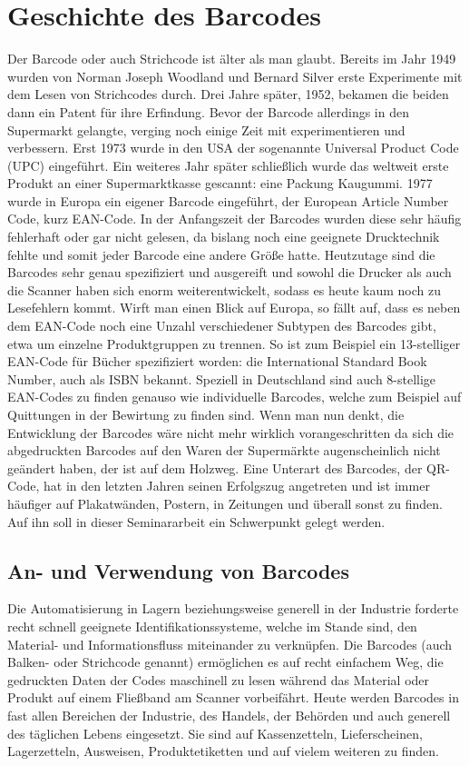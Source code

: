 \section{Geschichte des Barcodes}
Der Barcode oder auch Strichcode ist älter als man glaubt. Bereits im Jahr 1949 wurden von Norman Joseph Woodland und Bernard Silver erste Experimente mit dem Lesen von Strichcodes durch. Drei Jahre später, 1952, bekamen die beiden dann ein Patent für ihre Erfindung. 
Bevor der Barcode allerdings in den Supermarkt gelangte, verging noch einige Zeit mit experimentieren und verbessern. Erst 1973 wurde in den USA der sogenannte Universal Product Code (UPC) eingeführt. Ein weiteres Jahr später schließlich wurde das weltweit erste Produkt an einer Supermarktkasse gescannt: eine Packung Kaugummi.
1977 wurde in Europa ein eigener Barcode eingeführt, der European Article Number Code, kurz EAN-Code. 
In der Anfangszeit der Barcodes wurden diese sehr häufig fehlerhaft oder gar nicht gelesen, da bislang noch eine geeignete Drucktechnik fehlte und somit jeder Barcode eine andere Größe hatte. Heutzutage sind die Barcodes sehr genau spezifiziert und ausgereift und sowohl die Drucker als auch die Scanner haben sich enorm weiterentwickelt, sodass es heute kaum noch zu Lesefehlern kommt.
Wirft man einen Blick auf Europa, so fällt auf, dass es neben dem EAN-Code noch eine Unzahl verschiedener Subtypen des Barcodes gibt, etwa um einzelne Produktgruppen zu trennen. So ist zum Beispiel ein 13-stelliger EAN-Code für Bücher spezifiziert worden: die International Standard Book Number, auch als ISBN bekannt. Speziell in Deutschland sind auch 8-stellige EAN-Codes zu finden genauso wie individuelle Barcodes, welche zum Beispiel auf Quittungen in der Bewirtung zu finden sind.
Wenn man nun denkt, die Entwicklung der Barcodes wäre nicht mehr wirklich vorangeschritten da sich die abgedruckten Barcodes auf den Waren der Supermärkte augenscheinlich nicht geändert haben, der ist auf dem Holzweg. Eine Unterart des Barcodes, der QR-Code, hat in den letzten Jahren seinen Erfolgszug angetreten und ist immer häufiger auf Plakatwänden, Postern, in Zeitungen und überall sonst zu finden\cite{Plotz2015}. Auf ihn soll in dieser Seminararbeit ein Schwerpunkt gelegt werden.

\subsection{An- und Verwendung von Barcodes}
Die Automatisierung in Lagern beziehungsweise generell in der Industrie forderte recht schnell geeignete Identifikationssysteme, welche im Stande sind, den Material- und Informationsfluss miteinander zu verknüpfen. Die Barcodes (auch Balken- oder Strichcode genannt) ermöglichen es auf recht einfachem Weg, die gedruckten Daten der Codes maschinell zu lesen während das Material oder Produkt auf einem Fließband am Scanner vorbeifährt. Heute werden Barcodes in fast allen Bereichen der Industrie, des Handels, der Behörden und auch generell des täglichen Lebens eingesetzt. Sie sind auf Kassenzetteln, Lieferscheinen, Lagerzetteln, Ausweisen, Produktetiketten und auf vielem weiteren zu finden.
\pagebreak
